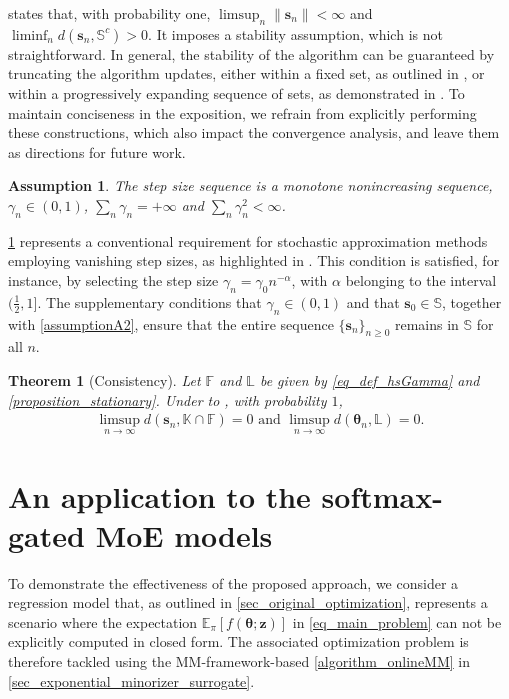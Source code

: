 \documentclass{article}
\newcommand{\md}{softmax-gated MoE }
\newtheorem{assumption}{Assumption}
\newtheorem{theorem}{Theorem}
\def\PE{\mathbb{E}_\pi} %
\def\param{\vtheta}
\newcommand{\ooint}[1]{\left(#1\right)}%
\def\rvz{{\mathbf{z}}}
\def\vtheta{{\bm{\theta}}}
\def\vs{{\bm{s}}}
\def\sF{{\mathbb{F}}}
\def\sL{{\mathbb{L}}}
\def\sS{{\mathbb{S}}}
\begin{document}
 states that, with probability one, $\limsup_n\|\vs_n\| < \infty$ and $\liminf_n d(\vs_n,\mathbb S^c) >0$.
It imposes a stability assumption, which is not straightforward. In general, the stability of the algorithm can be guaranteed by truncating the algorithm updates, either within a fixed set, as outlined in \cite[Chapter 2]{kushner_stochastic_2003}, or within a progressively expanding sequence of sets, as demonstrated in \cite{andrieu_stability_2005}. To maintain conciseness in the exposition, we refrain from explicitly performing these constructions, which also impact the convergence analysis, and leave them as directions for future work. 



\begin{assumption}\label{assumptionA11} The step size sequence is a monotone nonincreasing sequence,  $\gamma_n \in \ooint{0,1}$, 
$\sum_n \gamma_n = + \infty$ and $\sum_n \gamma_n^2 < \infty$.
\end{assumption}

\cref{assumptionA11}  represents a conventional requirement for stochastic approximation methods employing vanishing step sizes, as highlighted in \cite{kushner_stochastic_2003}. This condition is satisfied, for instance, by selecting the step size $\gamma_n = \gamma_0n^{-\alpha}$, with $\alpha$ belonging to the interval $(\frac{1}{2}, 1]$. The supplementary conditions that $\gamma_n \in (0,1)$ and that $\vs_0 \in \sS$, together with \cref{assumptionA2}, ensure that the entire sequence $\{\vs_n\}_{n \ge 0}$ remains in $\sS$ for all $n$.


\begin{theorem}[Consistency]\label{theorem_consistency}   
   Let $\mathbb{F}$ and $\mathbb{L}$ be given by \cref{eq_def_hsGamma} and \cref{proposition_stationary}. Under  to , with probability $1$, 
    \begin{align}
        \limsup_{n\rightarrow \infty} d(\vs_n,\mathbb{K} \cap \sF) = 0 \text{ and } \limsup_{n \rightarrow\infty} d(\param_n,\sL) = 0.
    \end{align}
\end{theorem}

\section{An application to the \md models}\label{sec_application_SGMoE}
To demonstrate the effectiveness of the proposed approach, we consider a regression model that, as outlined in \cref{sec_original_optimization}, represents a scenario where the expectation $\PE\left[f\left(\vtheta; \rvz \right)\right]$ in \cref{eq_main_problem} can not be explicitly computed in closed form. The associated optimization problem is therefore tackled using the MM-framework-based \cref{algorithm_onlineMM} in \cref{sec_exponential_minorizer_surrogate}.
\end{document}
